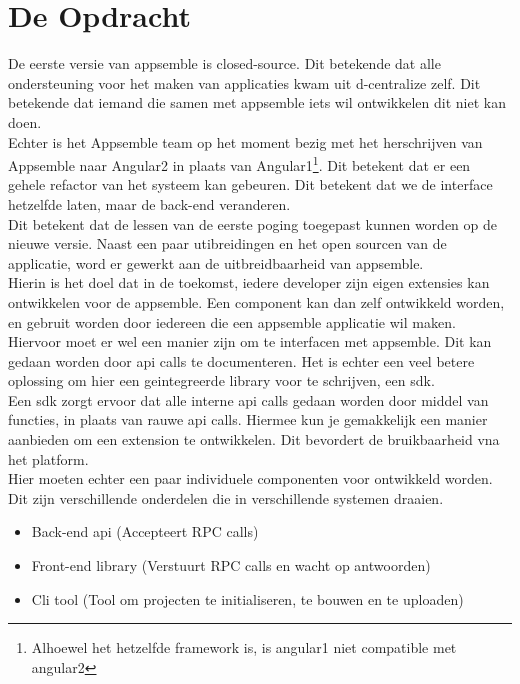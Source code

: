 \chapter{De Opdracht}

De eerste versie van appsemble is closed-source. Dit betekende dat alle ondersteuning voor het maken van applicaties kwam uit d-centralize zelf. Dit betekende dat iemand die samen met appsemble iets wil ontwikkelen dit niet kan doen. \\

Echter is het Appsemble team op het moment bezig met het herschrijven van Appsemble naar Angular2 in plaats van Angular1\footnote{Alhoewel het hetzelfde framework is, is angular1 niet compatible met angular2}. Dit betekent dat er een gehele refactor van het systeem kan gebeuren. Dit betekent dat we de interface hetzelfde laten, maar de back-end veranderen.\\

Dit betekent dat de lessen van de eerste poging toegepast kunnen worden op de nieuwe versie. Naast een paar utibreidingen en het open sourcen van de applicatie, word er gewerkt aan de uitbreidbaarheid van appsemble.\\

Hierin is het doel dat in de toekomst, iedere developer zijn eigen extensies kan ontwikkelen voor de appsemble. Een component kan dan zelf ontwikkeld worden, en gebruit worden door iedereen die een appsemble applicatie wil maken.\\

Hiervoor moet er wel een manier zijn om te interfacen met appsemble. Dit kan gedaan worden door api calls te documenteren. Het is echter een veel betere oplossing om hier een geintegreerde library voor te schrijven, een sdk.\\

Een sdk zorgt ervoor dat alle interne api calls gedaan worden  door middel van functies, in plaats van rauwe api calls. Hiermee kun je gemakkelijk een manier aanbieden om een extension te ontwikkelen. Dit bevordert de bruikbaarheid vna het platform.\\

Hier moeten echter een paar individuele componenten voor ontwikkeld worden. Dit zijn verschillende onderdelen die in verschillende systemen draaien. \\

\begin{itemize}
	\item Back-end api (Accepteert RPC calls)
	\item Front-end library (Verstuurt RPC calls en wacht op antwoorden)
	\item Cli tool (Tool om projecten te initialiseren, te bouwen en te uploaden)
\end{itemize}

